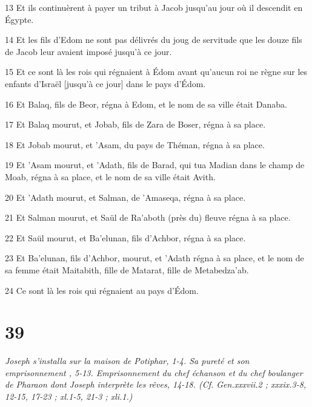 \par 13 Et ils continuèrent à payer un tribut à Jacob jusqu'au jour où il descendit en Égypte.
\par 14 Et les fils d'Edom ne sont pas délivrés du joug de servitude que les douze fils de Jacob leur avaient imposé jusqu'à ce jour.
\par 15 Et ce sont là les rois qui régnaient à Édom avant qu'aucun roi ne règne sur les enfants d'Israël [jusqu'à ce jour] dans le pays d'Édom.
\par 16 Et Balaq, fils de Beor, régna à Edom, et le nom de sa ville était Danaba.
\par 17 Et Balaq mourut, et Jobab, fils de Zara de Boser, régna à sa place.
\par 18 Et Jobab mourut, et 'Asam, du pays de Théman, régna à sa place.
\par 19 Et 'Asam mourut, et 'Adath, fils de Barad, qui tua Madian dans le champ de Moab, régna à sa place, et le nom de sa ville était Avith.
\par 20 Et 'Adath mourut, et Salman, de 'Amaseqa, régna à sa place.
\par 21 Et Salman mourut, et Saül de Ra'aboth (près du) fleuve régna à sa place.
\par 22 Et Saül mourut, et Ba'elunan, fils d'Achbor, régna à sa place.
\par 23 Et Ba'elunan, fils d'Achbor, mourut, et 'Adath régna à sa place, et le nom de sa femme était Maitabith, fille de Matarat, fille de Metabedza'ab.
\par 24 Ce sont là les rois qui régnaient au pays d'Édom.

\chapter{39}

\par \textit{Joseph s'installa sur la maison de Potiphar, 1-4. Sa pureté et son emprisonnement , 5-13. Emprisonnement du chef échanson et du chef boulanger de Pharaon dont Joseph interprète les rêves, 14-18. (Cf. Gen.xxxvii.2 ; xxxix.3-8, 12-15, 17-23 ; xl.1-5, 21-3 ; xli.1.)}

